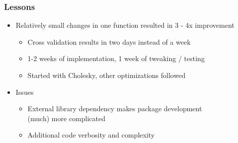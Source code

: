 \documentclass[t]{beamer}\usepackage[]{graphicx}\usepackage[]{color}
\begin{document}

\begin{frame}
\frametitle{Lessons}

\begin{itemize}    

\item Relatively small changes in one function resulted in 3 - 4x improvement

\begin{itemize}
\vspace{2mm} \item Cross validation results in two days instead of a week

\vspace{2mm} \item 1-2 weeks of implementation, 1 week of tweaking / testing

\vspace{2mm} \item Started with Cholesky, other optimizations followed
\end{itemize}

\vspace{7mm} \pause

\item Issues

\begin{itemize}
\vspace{2mm} \item External library dependency makes package development \\ (much) more complicated

\vspace{2mm} \item Additional code verbosity and complexity

\end{itemize}
\end{itemize}

\end{frame}

\end{document}
